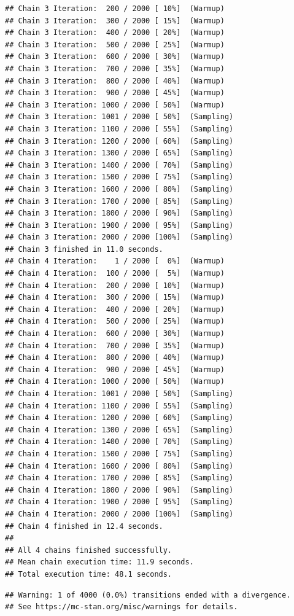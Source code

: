 \documentclass[
]{article}
\begin{document}
\begin{verbatim}
## Chain 3 Iteration:  200 / 2000 [ 10%]  (Warmup) 
## Chain 3 Iteration:  300 / 2000 [ 15%]  (Warmup) 
## Chain 3 Iteration:  400 / 2000 [ 20%]  (Warmup) 
## Chain 3 Iteration:  500 / 2000 [ 25%]  (Warmup) 
## Chain 3 Iteration:  600 / 2000 [ 30%]  (Warmup) 
## Chain 3 Iteration:  700 / 2000 [ 35%]  (Warmup) 
## Chain 3 Iteration:  800 / 2000 [ 40%]  (Warmup) 
## Chain 3 Iteration:  900 / 2000 [ 45%]  (Warmup) 
## Chain 3 Iteration: 1000 / 2000 [ 50%]  (Warmup) 
## Chain 3 Iteration: 1001 / 2000 [ 50%]  (Sampling) 
## Chain 3 Iteration: 1100 / 2000 [ 55%]  (Sampling) 
## Chain 3 Iteration: 1200 / 2000 [ 60%]  (Sampling) 
## Chain 3 Iteration: 1300 / 2000 [ 65%]  (Sampling) 
## Chain 3 Iteration: 1400 / 2000 [ 70%]  (Sampling) 
## Chain 3 Iteration: 1500 / 2000 [ 75%]  (Sampling) 
## Chain 3 Iteration: 1600 / 2000 [ 80%]  (Sampling) 
## Chain 3 Iteration: 1700 / 2000 [ 85%]  (Sampling) 
## Chain 3 Iteration: 1800 / 2000 [ 90%]  (Sampling) 
## Chain 3 Iteration: 1900 / 2000 [ 95%]  (Sampling) 
## Chain 3 Iteration: 2000 / 2000 [100%]  (Sampling) 
## Chain 3 finished in 11.0 seconds.
## Chain 4 Iteration:    1 / 2000 [  0%]  (Warmup) 
## Chain 4 Iteration:  100 / 2000 [  5%]  (Warmup) 
## Chain 4 Iteration:  200 / 2000 [ 10%]  (Warmup) 
## Chain 4 Iteration:  300 / 2000 [ 15%]  (Warmup) 
## Chain 4 Iteration:  400 / 2000 [ 20%]  (Warmup) 
## Chain 4 Iteration:  500 / 2000 [ 25%]  (Warmup) 
## Chain 4 Iteration:  600 / 2000 [ 30%]  (Warmup) 
## Chain 4 Iteration:  700 / 2000 [ 35%]  (Warmup) 
## Chain 4 Iteration:  800 / 2000 [ 40%]  (Warmup) 
## Chain 4 Iteration:  900 / 2000 [ 45%]  (Warmup) 
## Chain 4 Iteration: 1000 / 2000 [ 50%]  (Warmup) 
## Chain 4 Iteration: 1001 / 2000 [ 50%]  (Sampling) 
## Chain 4 Iteration: 1100 / 2000 [ 55%]  (Sampling) 
## Chain 4 Iteration: 1200 / 2000 [ 60%]  (Sampling) 
## Chain 4 Iteration: 1300 / 2000 [ 65%]  (Sampling) 
## Chain 4 Iteration: 1400 / 2000 [ 70%]  (Sampling) 
## Chain 4 Iteration: 1500 / 2000 [ 75%]  (Sampling) 
## Chain 4 Iteration: 1600 / 2000 [ 80%]  (Sampling) 
## Chain 4 Iteration: 1700 / 2000 [ 85%]  (Sampling) 
## Chain 4 Iteration: 1800 / 2000 [ 90%]  (Sampling) 
## Chain 4 Iteration: 1900 / 2000 [ 95%]  (Sampling) 
## Chain 4 Iteration: 2000 / 2000 [100%]  (Sampling) 
## Chain 4 finished in 12.4 seconds.
## 
## All 4 chains finished successfully.
## Mean chain execution time: 11.9 seconds.
## Total execution time: 48.1 seconds.
\end{verbatim}

\begin{verbatim}
## Warning: 1 of 4000 (0.0%) transitions ended with a divergence.
## See https://mc-stan.org/misc/warnings for details.
\end{verbatim}
\end{document}
